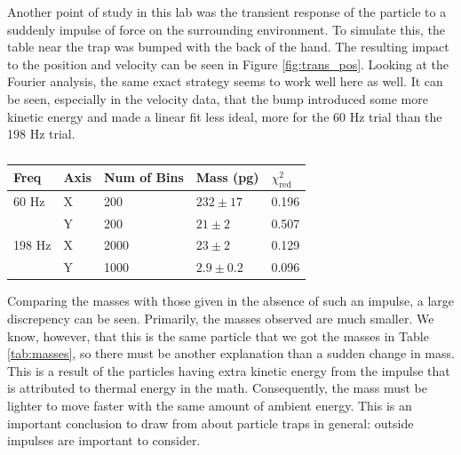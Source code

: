 \documentclass[12pt]{article}
\begin{document}
Another point of study in this lab was the transient response of the particle to a suddenly impulse of force on the surrounding environment. To simulate this, the table near the trap was bumped with the back of the hand. The resulting impact to the position and velocity can be seen in Figure \ref{fig:trans_pos}. Looking at the Fourier analysis, the same exact strategy seems to work well here as well. It can be seen, especially in the velocity data, that the bump introduced some more kinetic energy and made a linear fit less ideal, more for the 60 Hz trial than the 198 Hz trial. 

\begin{table}[ht]
\caption{}
\label{tab:trans_masses}
\centering
\begin{tabular}{lllll}
Freq   & Axis & Num of Bins & Mass (pg)     & $\chi_\text{red}^2$ \\ \hline
60 Hz  & X    & 200         & $232 \pm  17$ & 0.196               \\
       & Y    & 200         & $21 \pm 2$    & 0.507               \\
198 Hz & X    & 2000        & $23 \pm 2$    & 0.129               \\
       & Y    & 1000        & $2.9 \pm 0.2$ & 0.096              
\end{tabular}
\end{table}

Comparing the masses with those given in the absence of such an impulse, a large discrepency can be seen. Primarily, the masses observed are much smaller. We know, however, that this is the same particle that we got the masses in Table \ref{tab:masses}, so there must be another explanation than a sudden change in mass. This is a result of the particles having extra kinetic energy from the impulse that is attributed to thermal energy in the math. Consequently, the mass must be lighter to move faster with the same amount of ambient energy. This is an important conclusion to draw from about particle traps in general: outside impulses are important to consider. 
\end{document}
